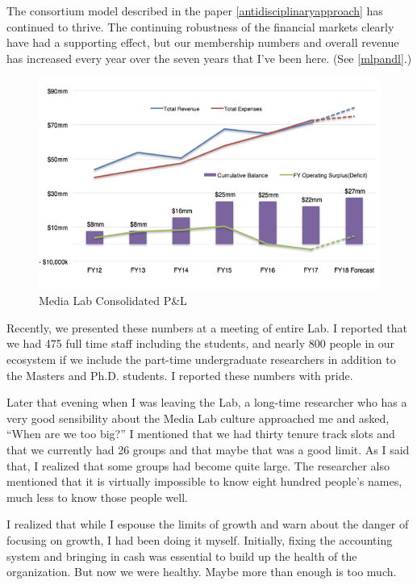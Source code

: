 The consortium model described in the paper \autoref{antidisciplinaryapproach} has continued to thrive. The continuing robustness of the financial markets clearly have had a supporting effect, but our membership numbers and overall revenue has increased every year over the seven years that I've been here. (See \autoref{mlpandl}.)

\begin{figure}[h]
 \centering
 \includegraphics[width=1\textwidth]{pictures/mlpandl.png}
 \caption{Media Lab Consolidated P\&L}
 \label{mlpandl}
\end{figure}

Recently, we presented these numbers at a meeting of entire Lab. I reported that we had 475 full time staff including the students, and nearly 800 people in our ecosystem if we include the part-time undergraduate researchers in addition to the Masters and Ph.D. students. I reported these numbers with pride.

Later that evening when I was leaving the Lab, a long-time researcher who has a very good sensibility about the Media Lab culture approached me and asked, ``When are we too big?'' I mentioned that we had thirty tenure track slots and that we currently had 26 groups and that maybe that was a good limit. As I said that, I realized that some groups had become quite large. The researcher also mentioned that it is virtually impossible to know eight hundred people's names, much less to know those people well.

I realized that while I espouse the limits of growth and warn about the danger of focusing on growth, I had been doing it myself. Initially, fixing the accounting system and bringing in cash was essential to build up the health of the organization. But now we were healthy. Maybe more than enough is too much.

